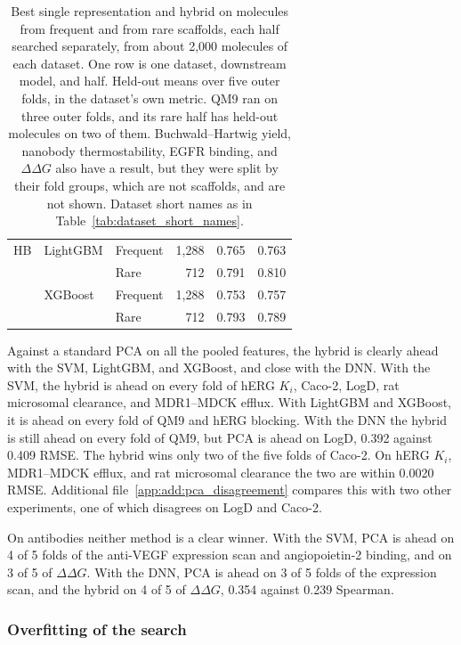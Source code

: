 \begin{table}[htbp]
\begin{tabular}{@{}lllrrr@{}}
HB & LightGBM & Frequent & 1{,}288 & 0.765 & 0.763 \\
 &  & Rare & 712 & 0.791 & 0.810 \\
 & XGBoost & Frequent & 1{,}288 & 0.753 & 0.757 \\
 &  & Rare & 712 & 0.793 & 0.789 \\
\bottomrule
\end{tabular}
\caption[Hybrid on molecules from frequent and rare scaffolds.]{Best single representation and hybrid on molecules from frequent and from rare scaffolds, each half searched separately, from about 2,000 molecules of each dataset. One row is one dataset, downstream model, and half. Held-out means over five outer folds, in the dataset's own metric. QM9 ran on three outer folds, and its rare half has held-out molecules on two of them. Buchwald--Hartwig yield, nanobody thermostability, EGFR binding, and $\Delta\Delta G$ also have a result, but they were split by their fold groups, which are not scaffolds, and are not shown. Dataset short names as in Table~\ref{tab:dataset_short_names}.}
\label{tab:method:scaffold_halves}
\end{table}

Against a standard PCA on all the pooled features, the hybrid is clearly ahead with the SVM, LightGBM, and XGBoost, and close with the DNN. With the SVM, the hybrid is ahead on every fold of hERG $K_i$, Caco-2, LogD, rat microsomal clearance, and MDR1--MDCK efflux. With LightGBM and XGBoost, it is ahead on every fold of QM9 and hERG blocking. With the DNN the hybrid is still ahead on every fold of QM9, but PCA is ahead on LogD, 0.392 against 0.409 RMSE. The hybrid wins only two of the five folds of Caco-2. On hERG $K_i$, MDR1--MDCK efflux, and rat microsomal clearance the two are within 0.0020 RMSE. Additional file~\ref{app:add:pca_disagreement} compares this with two other experiments, one of which disagrees on LogD and Caco-2.


On antibodies neither method is a clear winner. With the SVM, PCA is ahead on 4 of 5 folds of the anti-VEGF expression scan and angiopoietin-2 binding, and on 3 of 5 of $\Delta\Delta G$. With the DNN, PCA is ahead on 3 of 5 folds of the expression scan, and the hybrid on 4 of 5 of $\Delta\Delta G$, 0.354 against 0.239 Spearman.

\subsubsection{Overfitting of the search}\label{sec:method:results_overfit}

